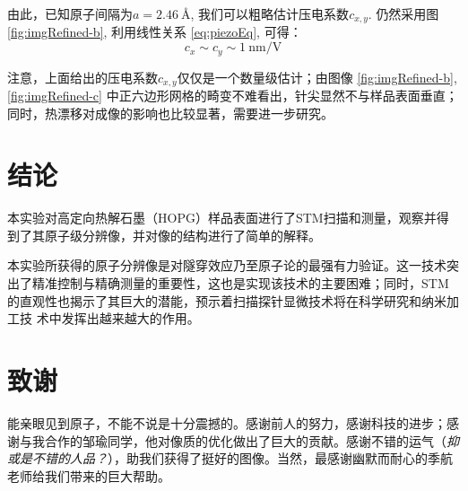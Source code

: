 \documentclass[aps,pre,12pt,preprint,%
	onecolumn,showpacs,showkeys,nofootinbib]{revtex4-1}
\begin{document}
	\vspace{-3ex}
	由此，已知原子间隔为$a = \SI{2.46}{\angstrom}$, 我们可以粗略估计压电系数$c_{x,y}$. 仍然采用图 \ref{fig:imgRefined-b}, 利用线性关系 \eqref{eq:piezoEq}, 可得：
	\begin{equation}
		c_x \sim c_y \sim \SI{1}{\nm/\V}
	\end{equation}
	
	注意，上面给出的压电系数$c_{x,y}$仅仅是一个数量级估计；由图像 \ref{fig:imgRefined-b}, \ref{fig:imgRefined-c} 中正六边形网格的畸变不难看出，针尖显然不与样品表面垂直；同时，热漂移对成像的影响也比较显著，需要进一步研究。
\section{结论}
	本实验对高定向热解石墨（HOPG）样品表面进行了STM扫描和测量，观察并得到了其原子级分辨像，并对像的结构进行了简单的解释。
	
	本实验所获得的原子分辨像是对隧穿效应乃至原子论的最强有力验证。这一技术突出了精准控制与精确测量的重要性，这也是实现该技术的主要困难；同时，STM的直观性也揭示了其巨大的潜能，预示着扫描探针显微技术将在科学研究和纳米加工技 术中发挥出越来越大的作用。
\section{致谢}
	能亲眼见到原子，不能不说是十分震撼的。感谢前人的努力，感谢科技的进步；感谢与我合作的邹瑜同学，他对像质的优化做出了巨大的贡献。感谢不错的运气（\textit{抑或是不错的人品？}），助我们获得了挺好的图像。当然，最感谢幽默而耐心的季航老师给我们带来的巨大帮助。

\setlength{\bibsep}{10pt}
\linespread{1.2}\selectfont



\clearpage
\end{document}
